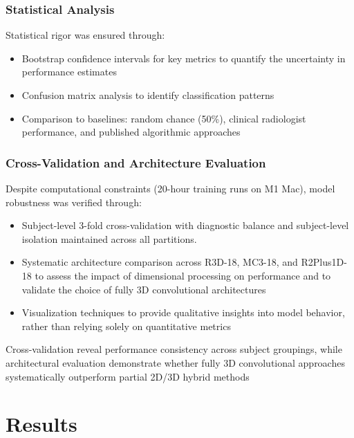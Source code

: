 \documentclass[12pt, a4paper]{article}
\begin{document}
\subsubsection{Statistical Analysis}

Statistical rigor was ensured through:

\begin{itemize}
    \item Bootstrap confidence intervals for key metrics to quantify the uncertainty in performance estimates
    
    \item Confusion matrix analysis to identify classification patterns
    
    \item Comparison to baselines: random chance (50\%), clinical radiologist performance, and published algorithmic approaches
\end{itemize}

\subsubsection{Cross-Validation and Architecture Evaluation}

Despite computational constraints (20-hour training runs on M1 Mac), model robustness was verified through:

\begin{itemize}
    \item Subject-level 3-fold cross-validation with diagnostic balance and subject-level isolation maintained across all partitions.
    
    \item Systematic architecture comparison across R3D-18, MC3-18, and R2Plus1D-18 to assess the impact of dimensional processing on performance and to validate the choice of fully 3D convolutional architectures
    
    \item Visualization techniques to provide qualitative insights into model behavior, rather than relying solely on quantitative metrics
\end{itemize}

Cross-validation reveal performance consistency across subject groupings, while architectural evaluation demonstrate whether fully 3D convolutional approaches systematically outperform partial 2D/3D hybrid methods

\section{Results}
\end{document}
